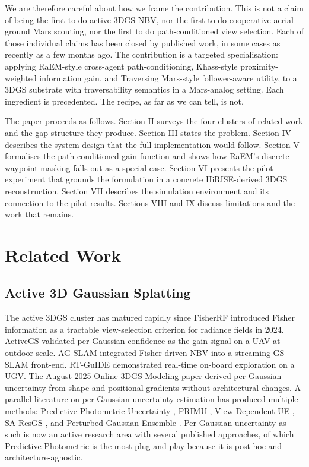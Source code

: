 \documentclass[conference]{IEEEtran}
\begin{document}
We are therefore careful about how we frame the contribution. This is not a claim of being the first to do active 3DGS NBV, nor the first to do cooperative aerial-ground Mars scouting, nor the first to do path-conditioned view selection. Each of those individual claims has been closed by published work, in some cases as recently as a few months ago. The contribution is a targeted specialisation: applying RaEM-style cross-agent path-conditioning, Khass-style proximity-weighted information gain, and Traversing Mars-style follower-aware utility, to a 3DGS substrate with traversability semantics in a Mars-analog setting. Each ingredient is precedented. The recipe, as far as we can tell, is not.

The paper proceeds as follows. Section II surveys the four clusters of related work and the gap structure they produce. Section III states the problem. Section IV describes the system design that the full implementation would follow. Section V formalises the path-conditioned gain function and shows how RaEM's discrete-waypoint masking falls out as a special case. Section VI presents the pilot experiment that grounds the formulation in a concrete HiRISE-derived 3DGS reconstruction. Section VII describes the simulation environment and its connection to the pilot results. Sections VIII and IX discuss limitations and the work that remains.

\section{Related Work}

\subsection{Active 3D Gaussian Splatting}
The active 3DGS cluster has matured rapidly since FisherRF \cite{fisherrf} introduced Fisher information as a tractable view-selection criterion for radiance fields in 2024. ActiveGS \cite{activegs} validated per-Gaussian confidence as the gain signal on a UAV at outdoor scale. AG-SLAM \cite{agslam} integrated Fisher-driven NBV into a streaming GS-SLAM front-end. RT-GuIDE \cite{rtguide} demonstrated real-time on-board exploration on a UGV. The August 2025 Online 3DGS Modeling paper \cite{online3dgs} derived per-Gaussian uncertainty from shape and positional gradients without architectural changes. A parallel literature on per-Gaussian uncertainty estimation has produced multiple methods: Predictive Photometric Uncertainty \cite{predphoto}, PRIMU \cite{primu}, View-Dependent UE \cite{viewdep}, SA-ResGS \cite{saresgs}, and Perturbed Gaussian Ensemble \cite{perturbed}. Per-Gaussian uncertainty as such is now an active research area with several published approaches, of which Predictive Photometric is the most plug-and-play because it is post-hoc and architecture-agnostic.
\end{document}
